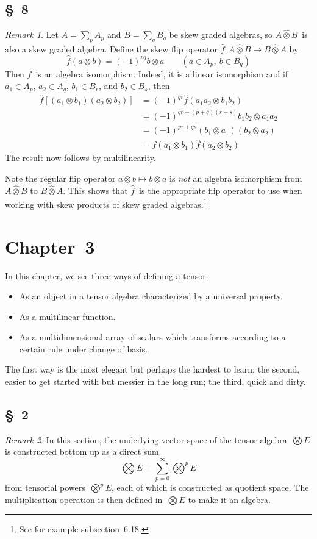 \documentclass[letterpaper,12pt]{article}
\newcommand{\tprod}{\otimes}
\newcommand{\bigtprod}{\bigotimes}
\newcommand{\medtprod}{{\textstyle\bigtprod}}
\newcommand{\stprod}{\mathbin{\widehat{\otimes}}}
\theoremstyle{definition}
\theoremstyle{remark}
\newtheorem*{rmk}{Remark}
\begin{document}
\subsection*{\S~8}
\begin{rmk}
Let \(A=\sum_p A_p\) and \(B=\sum_q B_q\) be skew graded algebras, so \(A\stprod B\)~is also a skew graded algebra. Define the skew flip operator \(\widehat{f}:A\stprod B\to B\stprod A\) by
\[\widehat{f}(a\tprod b)=(-1)^{pq}b\tprod a\qquad(a\in A_p,\ b\in B_q)\]
Then \(\widehat{f}\)~is an algebra isomorphism. Indeed, it is a linear isomorphism and if \(a_1\in A_p\), \(a_2\in A_q\), \(b_1\in B_r\), and \(b_2\in B_s\), then
\begin{align*}
\widehat{f}[(a_1\tprod b_1)(a_2\tprod b_2)]&=(-1)^{qr}\widehat{f}(a_1a_2\tprod b_1b_2)\\
	&=(-1)^{qr+(p+q)(r+s)}b_1b_2\tprod a_1a_2\\
	&=(-1)^{pr+qs}(b_1\tprod a_1)(b_2\tprod a_2)\\
	&=\widehat{f}(a_1\tprod b_1)\widehat{f}(a_2\tprod b_2)
\end{align*}
The result now follows by multilinearity.

Note the regular flip operator \(a\tprod b\mapsto b\tprod a\) is \emph{not} an algebra isomorphism from \(A\stprod B\) to \(B\stprod A\). This shows that \(\widehat{f}\)~is the appropriate flip operator to use when working with skew products of skew graded algebras.\footnote{See for example subsection~6.18.}
\end{rmk}

\newpage
\section*{Chapter~3}
In this chapter, we see three ways of defining a tensor:
\begin{itemize}[itemsep=0pt]
\item As an object in a tensor algebra characterized by a universal property.
\item As a multilinear function.
\item As a multidimensional array of scalars which transforms according to a certain rule under change of basis.
\end{itemize}
The first way is the most elegant but perhaps the hardest to learn; the second, easier to get started with but messier in the long run; the third, quick and dirty.

\subsection*{\S~2}
\begin{rmk}
In this section, the underlying vector space of the tensor algebra~\(\medtprod E\) is constructed bottom up as a direct sum
\[\medtprod E=\sum_{p=0}^{\infty}\medtprod^p E\]
from tensorial powers~\(\medtprod^p E\), each of which is constructed as quotient space. The multiplication operation is then defined in~\(\medtprod E\) to make it an algebra.
\end{rmk}
\end{document}

